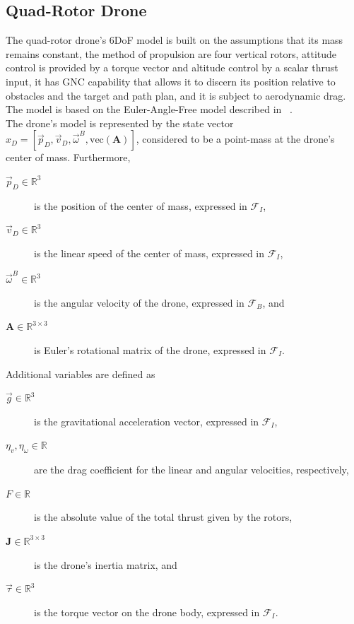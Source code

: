 \subsection{Quad-Rotor Drone}
The quad-rotor drone's \gls{6DoF} model is built on the assumptions that its mass remains constant, the method of propulsion are four vertical rotors, attitude control is provided by a torque vector and altitude control by a scalar thrust input, it has GNC capability that allows it to discern its position relative to obstacles and the target and path plan, and it is subject to aerodynamic drag. The model is based on the Euler-Angle-Free model described in ~\cite{AssloujE}. \\

The drone's model is represented by the state vector $x_D = [\vec{p}_{D}, \vec{v}_{D}, \vec{\omega}^B, \text{vec}(\mathbf{A})]$, considered to be a point-mass at the drone's center of mass. Furthermore,\\

\begin{description}
    \item[$\vec{p}_{D} \in \mathbb{R}^3$] is the position of the center of mass, expressed in $\mathcal{F}_I$,
    \item[$\vec{v}_{D} \in \mathbb{R}^3$] is the linear speed of the center of mass, expressed in $\mathcal{F}_I$,
    \item[$\vec{\omega}^B \in \mathbb{R}^3$] is the angular velocity of the drone, expressed in $\mathcal{F}_B$, and
    \item[$\mathbf{A} \in \mathbb{R}^{3 \times 3}$] is Euler's rotational matrix of the drone, expressed in $\mathcal{F}_I$. \\
\end{description}

Additional variables are defined as
\begin{description}
    \item[$\vec{g} \in \mathbb{R}^3$] is the gravitational acceleration vector, expressed in $\mathcal{F}_I$,
    \item[$\eta_v, \eta_{\omega} \in \mathbb{R}$] are the drag coefficient for the linear and angular velocities, respectively,
    \item[$F \in \mathbb{R}$] is the absolute value of the total thrust given by the rotors, 
    \item[$\mathbf{J} \in \mathbb{R}^{3 \times 3}$] is the drone's inertia matrix, and
    \item[$\vec{\tau} \in \mathbb{R}^3$] is the torque vector on the drone body, expressed in $\mathcal{F}_I$.\\
\end{description}

